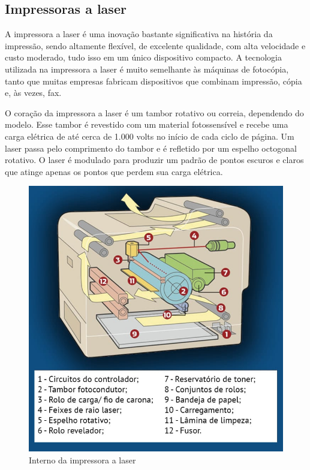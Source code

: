 \documentclass[12pt,a4, oneside, brazil]{article}
\begin{document}
		\subsection{Impressoras a laser}
		A impressora a laser é uma inovação bastante significativa na história da impressão, sendo altamente flexível, de excelente qualidade, com alta velocidade e custo moderado, tudo isso em um único dispositivo compacto. A tecnologia utilizada na impressora a laser é muito semelhante às máquinas de fotocópia, tanto que muitas empresas fabricam dispositivos que combinam impressão, cópia e, às vezes, fax.
		
		O coração da impressora a laser é um tambor rotativo ou correia, dependendo do modelo. Esse tambor é revestido com um material fotossensível e recebe uma carga elétrica de até cerca de 1.000 volts no início de cada ciclo de página. Um laser passa pelo comprimento do tambor e é refletido por um espelho octogonal rotativo. O laser é modulado para produzir um padrão de pontos escuros e claros que atinge apenas os pontos que perdem sua carga elétrica.
		
				\begin{figure}[H]
					\centering
					\includegraphics[width=13cm]{laser}
					\caption{Interno da impressora a laser}
					\label{fig:monomodo}
				\end{figure}
		
\end{document}
